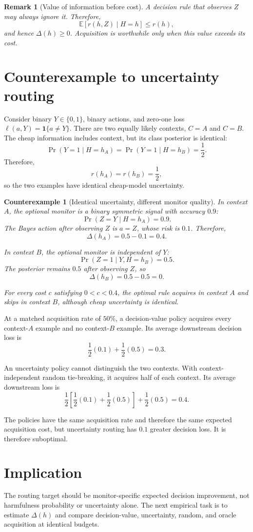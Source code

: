 \documentclass[11pt]{article}
\newtheorem{example}{Counterexample}
\newtheorem{remark}{Remark}
\begin{document}
\begin{remark}[Value of information before cost]
A decision rule that observes \(Z\) may always ignore it. Therefore,
\[
\mathbb{E}\!\left[r(h,Z)\mid H=h\right]\leq r(h),
\]
and hence \(\Delta(h)\geq 0\). Acquisition is worthwhile only when this value
exceeds its cost.
\end{remark}

\section{Counterexample to uncertainty routing}

Consider binary \(Y\in\{0,1\}\), binary actions, and zero-one loss
\(\ell(a,Y)=\mathbf{1}\{a\neq Y\}\). There are two equally likely contexts,
\(C=A\) and \(C=B\). The cheap information includes context, but its class
posterior is identical:
\[
\Pr(Y=1\mid H=h_A)
=
\Pr(Y=1\mid H=h_B)
=
\frac{1}{2}.
\]
Therefore,
\[
r(h_A)=r(h_B)=\frac{1}{2},
\]
so the two examples have identical cheap-model uncertainty.

\begin{example}[Identical uncertainty, different monitor quality]
In context \(A\), the optional monitor is a binary symmetric signal with
accuracy \(0.9\):
\[
\Pr(Z=Y\mid H=h_A)=0.9.
\]
The Bayes action after observing \(Z\) is \(a=Z\), whose risk is \(0.1\).
Therefore,
\[
\Delta(h_A)=0.5-0.1=0.4.
\]

In context \(B\), the optional monitor is independent of \(Y\):
\[
\Pr(Z=1\mid Y,H=h_B)=0.5.
\]
The posterior remains \(0.5\) after observing \(Z\), so
\[
\Delta(h_B)=0.5-0.5=0.
\]

For every cost \(c\) satisfying \(0<c<0.4\), the optimal rule acquires in
context \(A\) and skips in context \(B\), although cheap uncertainty is
identical.
\end{example}

At a matched acquisition rate of \(50\%\), a decision-value policy acquires
every context-\(A\) example and no context-\(B\) example. Its average downstream
decision loss is
\[
\frac{1}{2}(0.1)+\frac{1}{2}(0.5)=0.3.
\]

An uncertainty policy cannot distinguish the two contexts. With
context-independent random tie-breaking, it acquires half of each context.
Its average downstream loss is
\[
\frac{1}{2}\left[\frac{1}{2}(0.1)+\frac{1}{2}(0.5)\right]
+
\frac{1}{2}(0.5)
=
0.4.
\]

The policies have the same acquisition rate and therefore the same expected
acquisition cost, but uncertainty routing has \(0.1\) greater decision loss.
It is therefore suboptimal.

\section{Implication}

The routing target should be monitor-specific expected decision improvement,
not harmfulness probability or uncertainty alone. The next empirical task is
to estimate \(\Delta(h)\) and compare decision-value, uncertainty, random, and
oracle acquisition at identical budgets.
\end{document}
